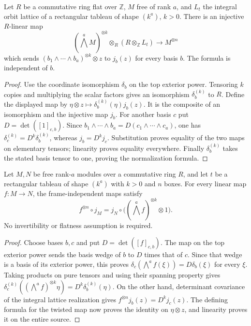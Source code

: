 \begin{lemma}
\label{lem:determinant-twisted-free-inclusion}
\leanok
Let $R$ be a commutative ring flat over $\mathbb Z$, $M$ free of rank $a$,
and $L_t$ the integral orbit lattice of a rectangular tableau of shape
$(k^a)$, $k>0$. There is an injective $R$-linear map
\[
 (\textstyle\bigwedge^a M)^{\otimes k}\otimes_R
 (R\otimes_{\mathbb Z}L_t)\longrightarrow M^{\otimes n}
\]
which sends $(b_1\wedge\cdots\wedge b_a)^{\otimes k}\otimes z$
to $j_b(z)$ for every basis $b$. The formula is independent of $b$.
\end{lemma}
\begin{proof}
Use the coordinate isomorphism $\delta_b$ on the top exterior power.
Tensoring $k$ copies and multiplying the scalar factors
gives an isomorphism $\delta_b^{(k)}$ to $R$.
Define the displayed map by
$\eta\otimes z\mapsto\delta_b^{(k)}(\eta)j_b(z)$.
It is the composite of an isomorphism and the injective map $j_b$.
For another basis $c$ put $D=\det([1]_{c,b})$. Since
$b_1\wedge\cdots\wedge b_a=D(c_1\wedge\cdots\wedge c_a)$,
one has $\delta_c^{(k)}=D^k\delta_b^{(k)}$, whereas $j_b=D^k j_c$.
Substitution proves equality of the two maps on elementary tensors;
linearity proves equality everywhere. Finally $\delta_b^{(k)}$ takes
the stated basis tensor to one, proving the normalization formula.
\end{proof}

\begin{lemma}
\label{lem:determinant-free-naturality}
\leanok
Let $M,N$ be free rank-$a$ modules over a commutative ring $R$, and let
$t$ be a rectangular tableau of shape $(k^a)$ with $k>0$ and $n$ boxes.
For every linear map $f:M\to N$, the frame-independent maps satisfy
\[
 f^{\otimes n}\circ j_M
 =j_N\circ\bigl((\bigwedge^a f)^{\otimes k}\otimes 1\bigr).
\]
No invertibility or flatness assumption is required.
\end{lemma}
\begin{proof}
Choose bases $b,c$ and put $D=\det([f]_{c,b})$. The map on the top
exterior power sends the basis wedge of $b$ to $D$ times that of $c$.
Since that wedge is a basis of its exterior power, this proves
$\delta_c(\bigwedge^a f(\xi))=D\delta_b(\xi)$ for every $\xi$.
Taking products on pure tensors and using their spanning property gives
$\delta_c^{(k)}((\bigwedge^a f)^{\otimes k}\eta)
=D^k\delta_b^{(k)}(\eta)$. On the other hand, determinant covariance
of the integral lattice realization gives
$f^{\otimes n}j_b(z)=D^k j_c(z)$. The defining formula for the twisted
map now proves the identity on $\eta\otimes z$, and linearity proves
it on the entire source.
\end{proof}

